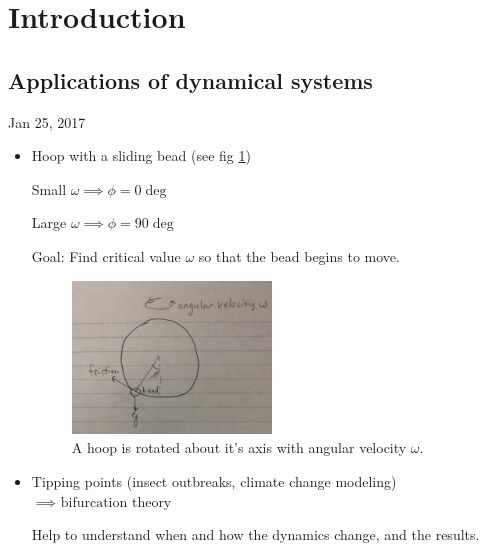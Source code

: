 \documentclass[main.tex]{subfiles}
\begin{document}
\vspace{3mm}

\section{Introduction}

\subsection{Applications of dynamical systems}

\hrulefill

Jan 25, 2017

\begin{itemize}
    \item
    Hoop with a sliding bead (see fig \ref{fig:hoop-and-bead})

    Small $\omega \implies \phi = 0\deg$

    Large $\omega \implies \phi = 90\deg$

    Goal: Find critical value $\omega$ so that the bead begins to move.
        \begin{figure}[ht]
        \centering
        \includegraphics[width=0.5\textwidth]{hoop-fig}
        \caption{A hoop is rotated about it's axis with angular velocity $\omega$.}
        \label{fig:hoop-and-bead}
        \end{figure}
    \item
    Tipping points (insect outbreaks, climate change modeling) $\implies \textrm{ bifurcation theory}$

    Help to understand when and how the dynamics change, and the results.


\end{itemize}
\end{document}
